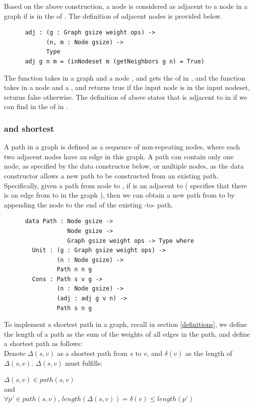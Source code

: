 Based on the above construction, a node  is considered as adjacent to a node  in a graph  if  is in the  of . The definition of adjacent nodes is provided below. 
\begin{lstlisting}
      adj : (g : Graph gsize weight ops) ->
            (n, m : Node gsize) -> 
            Type
      adj g n m = (inNodeset m (getNeighbors g n) = True)
\end{lstlisting}

The  function takes in a graph  and a node , and gets the  of  in , and the  function takes in a node and a , and returns true if the input node is in the input nodeset, returns false otherwise. The definition of  above states that  is adjacent to  in  if we can find  in the  of  in . 
\\

\subsubsection{ and shortest } \label{path}
A path in a graph is defined as a sequence of non-repeating nodes, where each two adjacent nodes have an edge in this graph. A path can contain only one node, as specified by the  data constructor below, or multiple nodes, as the  data constructor allows a new path to be constructed from an existing path. Specifically, given a path from node  to , if  is an adjacent to  ( specifies that there is an edge from  to  in the graph ), then we can obtain a new path from  to  by appending the node  to the end of the existing -to- path. 
\begin{lstlisting} 
      data Path : Node gsize ->
                  Node gsize ->
                  Graph gsize weight ops -> Type where
        Unit : (g : Graph gsize weight ops) ->
               (n : Node gsize) ->
               Path n n g
        Cons : Path s v g ->
               (n : Node gsize) ->
               (adj : adj g v n) ->
               Path s n g
\end{lstlisting}

To implement a shortest path in a graph, recall in section \ref{definitions}, we define the length of a path as the sum of the weights of all edges in the path, and define a shortest path as follows:
\\
\tab Denote $\Delta(s, v)$ as a shortest path from $s$ to $v$, and $\delta(v)$ as the length of $\Delta(s, v)$. $\Delta(s, v)$ must fulfills: 
\begin{center}
$\Delta(s, v) \in path(s, v)$ 
\\
and 
\\
$\forall p' \in path(s, v)$, $length(\Delta(s, v)) = \delta(v) \leq length(p')$
\end{center}

